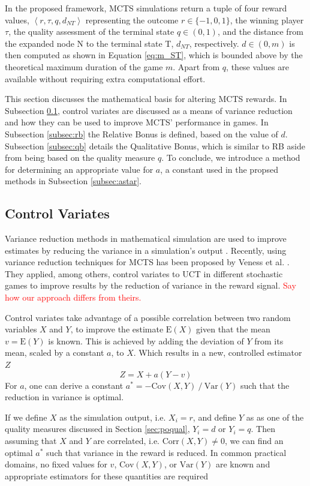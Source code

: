 \documentclass{ecai2014}
\newcommand\todo[1]{\textcolor{red}{#1}}
\newcommand{\tuple}[1]{\ensuremath{\left \langle #1 \right \rangle }}
\newcommand{\node}[1]{{\fontfamily{phv}\selectfont#1}}
\newcommand{\E}[1]{\mathrm{E}\left( #1 \right)}
\newcommand{\Var}[1]{\mathrm{Var}\left( #1 \right)}
\newcommand{\Cov}[1]{\mathrm{Cov}\left( #1 \right)}
\newcommand{\Corr}[1]{\mathrm{Corr}\left( #1 \right)}
\begin{document}
In the proposed framework, MCTS simulations return a tuple of four reward values, $\tuple{r,\tau,q,d_{NT}}$ representing the outcome $r\in\{-1, 0, 1\}$, the winning player $\tau$, the quality assessment of the terminal state $q\in(0, 1)$, and the distance from the expanded node \node{N} to the terminal state \node{T}, $d_{NT}$, respectively. $d\in(0, m)$ is then computed as shown in Equation \ref{eq:m_ST}, which is bounded above by the theoretical maximum duration of the game $m$. Apart from $q$, these values are available without requiring extra computational effort.

This section discusses the mathematical basis for altering MCTS rewards. In Subsection \ref{sub:cv}, control variates are discussed as a means of variance reduction and how they can be used to improve MCTS' performance in games. In Subsection \ref{subsec:rb} the Relative Bonus is defined, based on the value of $d$. Subsection \ref{subsec:qb} details the Qualitative Bonus, which is similar to RB aside from being based on the quality measure $q$. To conclude, we introduce a method for determining an appropriate value for $a$, a constant used in the propsed methods in Subsection \ref{subsec:astar}.

\subsection{Control Variates}
\label{sub:cv}
Variance reduction methods in mathematical simulation are used to improve estimates by reducing the variance in a simulation's output \cite{kelton2000simulation}. Recently, using variance reduction techniques for MCTS has been proposed by Veness et al. \cite{Veness11variance}. They applied, among others, control variates to UCT in different stochastic games to improve results by the reduction of variance in the reward signal. \todo{Say how our approach differs from theirs.}

Control variates take advantage of a possible correlation between two random variables $X$ and $Y$, to improve the estimate $\E{X}$ given that the mean $v=\E{Y}$ is known. This is achieved by adding the deviation of $Y$ from its mean, scaled by a constant $a$, to $X$. Which results in a new, controlled estimator $Z$
\begin{equation}
Z=X+a\left(Y-v\right)
\end{equation}
For $a$, one can derive a constant $a^*=-\Cov{X,Y}\mathbin{/}\Var{Y}$ such that the reduction in variance is optimal.

If we define $X$ as the simulation output, i.e. $X_i=r$, and define $Y$ as as one of the quality measures discussed in Section \ref{sec:poqual}, $Y_i=d$ or $Y_i=q$. Then assuming that $X$ and $Y$ are correlated, i.e. $\Corr{X,Y}\neq0$, we can find an optimal $a^*$ such that variance in the reward is reduced. In common practical domains, no fixed values for $v$, $\Cov{X,Y}$, or $\Var{Y}$ are known and appropriate estimators for these quantities are required
\end{document}
